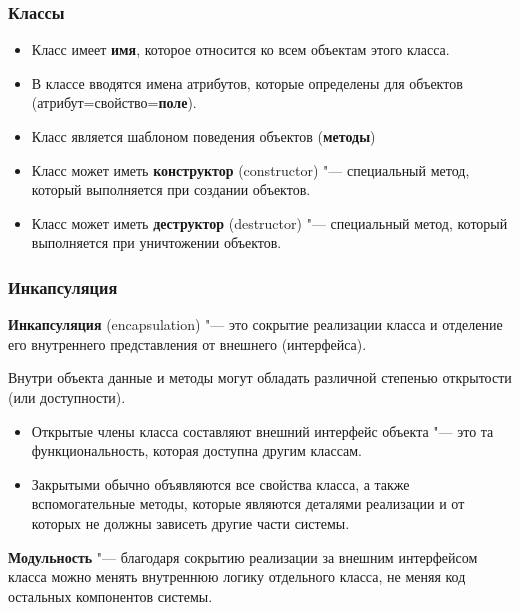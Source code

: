 \documentclass[default]{beamer}
\begin{document}
	\begin{frame}
		\frametitle{Классы}
		
		\begin{itemize}
			\item Класс имеет \textbf{имя}, которое относится ко всем объектам этого класса.
			\item В классе вводятся имена атрибутов, которые определены для объектов (атрибут=свойство=\textbf{поле}).
			\item Класс является шаблоном поведения объектов (\textbf{методы})
			\item Класс может иметь \textbf{конструктор} (constructor) "--- специальный метод, который выполняется при создании объектов.
			\item Класс может иметь \textbf{деструктор} (destructor) "--- специальный метод, который выполняется при уничтожении объектов.
		\end{itemize}
	\end{frame}	

	\begin{frame}
		\frametitle{Инкапсуляция}
		
		\textbf{Инкапсуляция} (encapsulation) "--- это сокрытие реализации класса и отделение его внутреннего представления от внешнего (интерфейса).
		\par\bigskip
		Внутри объекта данные и методы могут обладать различной степенью открытости (или доступности).
		\begin{itemize}
			\item Открытые члены класса составляют внешний интерфейс объекта "--- это та функциональность, которая доступна другим классам.
			\item Закрытыми обычно объявляются все свойства класса, а также вспомогательные методы, которые являются деталями реализации и от которых не должны зависеть другие части системы.
		\end{itemize}
		
		\textbf{Модульность} "--- благодаря сокрытию реализации за внешним интерфейсом класса можно менять внутреннюю логику отдельного класса, не меняя код остальных компонентов системы.
	\end{frame}
\end{document}
